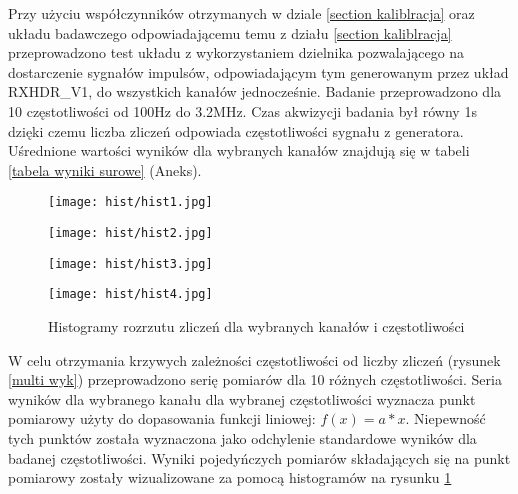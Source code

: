 Przy użyciu współczynników otrzymanych w dziale \ref{section kaliblracja} oraz układu badawczego odpowiadającemu temu z działu \ref{section kaliblracja} przeprowadzono test układu z wykorzystaniem dzielnika pozwalającego na dostarczenie sygnałów impulsów, odpowiadającym tym generowanym przez układ RXHDR\_V1, do wszystkich kanałów jednocześnie.
Badanie przeprowadzono dla 10 częstotliwości od 100Hz do 3.2MHz. Czas akwizycji badania był równy 1s dzięki czemu liczba zliczeń odpowiada częstotliwości sygnału z generatora. Uśrednione wartości wyników dla wybranych kanałów znajdują się w tabeli \ref{tabela wyniki surowe} (Aneks).

\begin{figure}
        \begin{multicols}{2}
            \texttt{[image: hist/hist1.jpg]} \par    
            \texttt{[image: hist/hist2.jpg]} \par    
        \end{multicols} \hfill
        \begin{multicols}{2}
            \texttt{[image: hist/hist3.jpg]} \par
            \texttt{[image: hist/hist4.jpg]} \par    
        \end{multicols}
        \caption{Histogramy rozrzutu zliczeń dla wybranych kanałów i częstotliwości}
        \label{hist licz}
\end{figure}

W celu otrzymania krzywych zależności częstotliwości od liczby zliczeń (rysunek \ref{multi wyk}) przeprowadzono serię pomiarów dla 10 różnych częstotliwości. Seria wyników dla wybranego kanału dla wybranej częstotliwości wyznacza punkt pomiarowy użyty do dopasowania funkcji liniowej: $f(x) = a * x$. Niepewność tych punktów została wyznaczona jako odchylenie standardowe wyników dla badanej częstotliwości. Wyniki pojedyńczych pomiarów składających się na punkt pomiarowy zostały wizualizowane za pomocą histogramów na rysunku \ref{hist licz}

